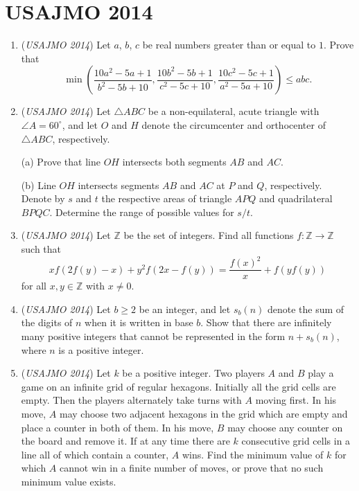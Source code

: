 \section{USAJMO 2014}
        \begin{enumerate}
        	\item (\textit{USAJMO 2014}) Let $a$, $b$, $c$ be real numbers greater than or equal to $1$. Prove that 
 \[\min{\left (\frac{10a^2-5a+1}{b^2-5b+10},\frac{10b^2-5b+1}{c^2-5c+10},\frac{10c^2-5c+1}{a^2-5a+10}\right )}\leq abc.\]


	\item (\textit{USAJMO 2014}) Let $\triangle{ABC}$ be a non-equilateral, acute triangle with $\angle A=60^\circ$, and let $O$ and $H$ denote the circumcenter and orthocenter of $\triangle{ABC}$, respectively.


 (a) Prove that line $OH$ intersects both segments $AB$ and $AC$.


 (b) Line $OH$ intersects segments $AB$ and $AC$ at $P$ and $Q$, respectively. Denote by $s$ and $t$ the respective areas of triangle $APQ$ and quadrilateral $BPQC$. Determine the range of possible values for $s/t$.


 

	\item (\textit{USAJMO 2014}) Let $\mathbb{Z}$ be the set of integers. Find all functions $f : \mathbb{Z} \rightarrow \mathbb{Z}$ such that 
 \[xf(2f(y)-x)+y^2f(2x-f(y))=\frac{f(x)^2}{x}+f(yf(y))\] for all $x, y \in \mathbb{Z}$ with $x \neq 0$.


 

	\item (\textit{USAJMO 2014}) Let $b\geq 2$ be an integer, and let $s_b(n)$ denote the sum of the digits of $n$ when it is written in base $b$.  Show that there are infinitely many positive integers that cannot be represented in the form $n+s_b(n)$, where $n$ is a positive integer.


 

	\item (\textit{USAJMO 2014}) Let $k$ be a positive integer. Two players $A$ and $B$ play a game on an infinite grid of regular hexagons. Initially all the grid cells are empty. Then the players alternately take turns with $A$ moving first. In his move, $A$ may choose two adjacent hexagons in the grid which are empty and place a counter in both of them. In his move, $B$ may choose any counter on the board and remove it. If at any time there are $k$ consecutive grid cells in a line all of which contain a counter, $A$ wins. Find the minimum value of $k$ for which $A$ cannot win in a finite number of moves, or prove that no such minimum value exists.



\end{enumerate}
